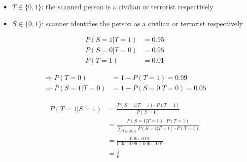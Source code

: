 \begin{itemize}
  \item{$T \in \{0,1\}$: the scanned person is a civilian or terrorist respectively}
  \item{$S \in \{0,1\}$: scanner identifies the person as a civilian or terrorist respectively}
\end{itemize}

\begin{align*}
P(S=1|T=1) &= 0.95 \\
P(S=0|T=0) &= 0.95 \\
P(T=1) &= 0.01
\end{align*}

\begin{align*}
\Rightarrow P(T=0) &= 1 - P(T=1) = 0.99 \\
\Rightarrow P(S=1|T=0) &= 1 - P(S=0|T=0) = 0.05
\end{align*}

\begin{align*}
P(T=1|S=1) &= \frac{P(S=1|T=1) \cdot P(T=1)}{P(S=1)} \\
           &= \frac{P(S=1|T=1) \cdot P(T=1)}{\sum\limits_{t \in \{0,1\}} P(S=1|T=t) \cdot P(T=t)} \\
	   &= \frac{0.95 \cdot 0.01}{0.05 \cdot 0.99 + 0.95 \cdot 0.01} \\
	   &= \frac{1}{6}
\end{align*}

